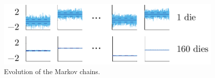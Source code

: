 \begin{figure}[bl]
  \vspace{-1.5em}
  \centering
  \includegraphics[width=0.9\linewidth]{include/figures/chains.pdf}
  \caption{Evolution of the Markov chains.}
\end{figure}
